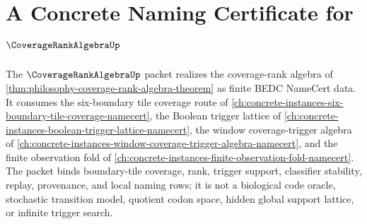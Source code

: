 \chapter{A Concrete Naming Certificate for $\CoverageRankAlgebraUp$}
\label{ch:concrete-instances-coverage-rank-algebra-namecert}

The $\CoverageRankAlgebraUp$ packet realizes the coverage-rank algebra of \autoref{thm:philosophy-coverage-rank-algebra-theorem} as finite BEDC NameCert data. It consumes the six-boundary tile coverage route of \autoref{ch:concrete-instances-six-boundary-tile-coverage-namecert}, the Boolean trigger lattice of \autoref{ch:concrete-instances-boolean-trigger-lattice-namecert}, the window coverage-trigger algebra of \autoref{ch:concrete-instances-window-coverage-trigger-algebra-namecert}, and the finite observation fold of \autoref{ch:concrete-instances-finite-observation-fold-namecert}. The packet binds boundary-tile coverage, rank, trigger support, classifier stability, replay, provenance, and local naming rows; it is not a biological code oracle, stochastic transition model, quotient codon space, hidden global support lattice, or infinite trigger search.

